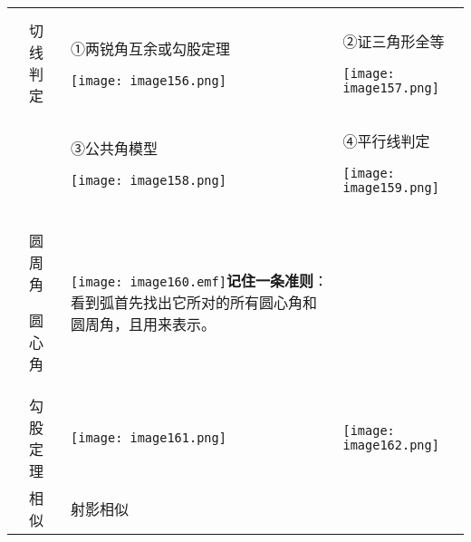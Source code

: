 \begin{longtable}[]{@{}llll@{}}
\toprule
\endhead
& & &\tabularnewline
\begin{minipage}[t]{0.22\columnwidth}\raggedright
\strut
\end{minipage} & \begin{minipage}[t]{0.22\columnwidth}\raggedright
切线判定\strut
\end{minipage} & \begin{minipage}[t]{0.22\columnwidth}\raggedright
①两锐角互余或勾股定理

\texttt{[image: image156.png]}\strut
\end{minipage} & \begin{minipage}[t]{0.22\columnwidth}\raggedright
②证三角形全等

\texttt{[image: image157.png]}\strut
\end{minipage}\tabularnewline
\begin{minipage}[t]{0.22\columnwidth}\raggedright
\strut
\end{minipage} & \begin{minipage}[t]{0.22\columnwidth}\raggedright
\strut
\end{minipage} & \begin{minipage}[t]{0.22\columnwidth}\raggedright
③公共角模型

\texttt{[image: image158.png]}\strut
\end{minipage} & \begin{minipage}[t]{0.22\columnwidth}\raggedright
④平行线判定

\texttt{[image: image159.png]}\strut
\end{minipage}\tabularnewline
\begin{minipage}[t]{0.22\columnwidth}\raggedright
\strut
\end{minipage} & \begin{minipage}[t]{0.22\columnwidth}\raggedright
圆周角

圆心角\strut
\end{minipage} & \begin{minipage}[t]{0.22\columnwidth}\raggedright
\texttt{[image: image160.emf]}\textbf{记住一条准则}：看到弧首先找出它所对的所有圆心角和圆周角，且用来表示。\strut
\end{minipage} & \begin{minipage}[t]{0.22\columnwidth}\raggedright
\strut
\end{minipage}\tabularnewline
& 勾股定理 &
\texttt{[image: image161.png]}
&
\texttt{[image: image162.png]}\tabularnewline
\begin{minipage}[t]{0.22\columnwidth}\raggedright
\strut
\end{minipage} & \begin{minipage}[t]{0.22\columnwidth}\raggedright
相 似\strut
\end{minipage} & \begin{minipage}[t]{0.22\columnwidth}\raggedright
射影相似


\end{minipage}
\end{longtable}
